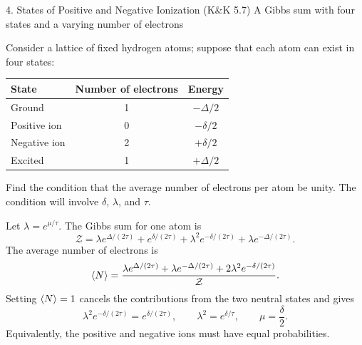 \documentclass[11pt]{article}
\begin{document}
\begin{problem}{4. States of Positive and Negative Ionization (K\&K 5.7)}
A Gibbs sum with four states and a varying number of electrons

Consider a lattice of fixed hydrogen atoms; suppose that each atom can exist in four states:
\begin{center}
  \begin{tabular}{lcc}
    \hline
    State & Number of electrons & Energy \\
    \hline
    Ground & 1 & \(-\Delta/2\) \\
    Positive ion & 0 & \(-\delta/2\) \\
    Negative ion & 2 & \(+\delta/2\) \\
    Excited & 1 & \(+\Delta/2\) \\
    \hline
  \end{tabular}
\end{center}
Find the condition that the average number of electrons per atom be unity.
The condition will involve \(\delta\), \(\lambda\), and \(\tau\).
\begin{answer}

Let \(\lambda=e^{\mu/\tau}\). The Gibbs sum for one atom is
\begin{equation}
\label{eq:p4-gibbs}
\mathcal Z=\lambda e^{\Delta/(2\tau)}+e^{\delta/(2\tau)}
+\lambda^2e^{-\delta/(2\tau)}+\lambda e^{-\Delta/(2\tau)}.
\end{equation}
The average number of electrons is
\begin{equation}
\label{eq:p4-average}
\ev{N}=\frac{\lambda e^{\Delta/(2\tau)}+\lambda e^{-\Delta/(2\tau)}
+2\lambda^2e^{-\delta/(2\tau)}}{\mathcal Z}.
\end{equation}
Setting \(\ev N=1\) cancels the contributions from the two neutral states and gives
\begin{equation}
\label{eq:p4-condition}
\lambda^2e^{-\delta/(2\tau)}=e^{\delta/(2\tau)},
\qquad \boxed{\lambda^2=e^{\delta/\tau}},
\qquad \mu=\frac{\delta}{2}.
\end{equation}
Equivalently, the positive and negative ions must have equal probabilities.
\end{answer}
\end{problem}
\end{document}
